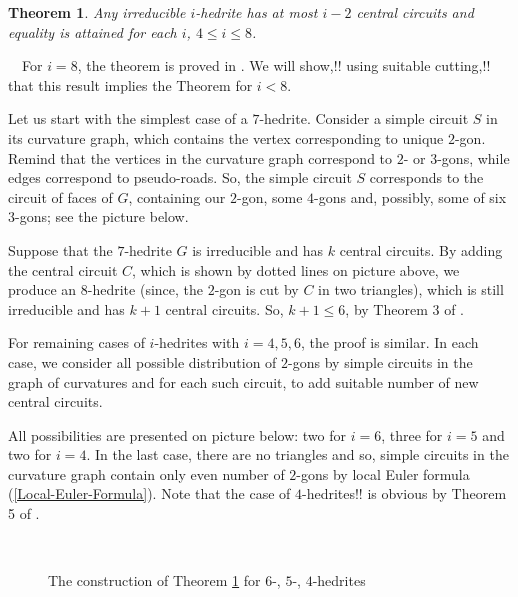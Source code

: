 \documentclass[12pt]{article}
\newtheorem{theor}{Theorem}
\newcommand{\proof}{\noindent{\bf Proof.}\ \ }
\begin{document}
\begin{theor}\label{irre}
Any irreducible $i$-hedrite has at most $i-2$ central circuits and equality is attained for each $i$, $4\leq i\leq 8$.
\end{theor}
\proof For $i=8$, the theorem is proved in \cite{DSt}. We will 
show,!! using suitable cutting,!! that this result implies the Theorem for $i<8$.

Let us start with the simplest case of a $7$-hedrite. Consider a simple circuit $S$ in its curvature graph, which contains the vertex corresponding to unique $2$-gon. Remind that the vertices in the curvature graph correspond to $2$- or $3$-gons, while edges correspond to pseudo-roads. So, the simple circuit $S$ corresponds to the circuit of faces of $G$, containing our $2$-gon, some $4$-gons and, possibly, some of six $3$-gons; see the picture below.


\begin{center}
\epsfxsize=40mm
\end{center}






Suppose that the $7$-hedrite $G$ is irreducible and has $k$ central circuits. By adding the central circuit $C$, which is shown by dotted lines on picture above, we produce an $8$-hedrite (since, the $2$-gon is cut by $C$ in two triangles), which is still irreducible and has $k+1$ central circuits. So, $k+1\leq 6$, by Theorem 3 of \cite{DSt}.


For remaining cases of $i$-hedrites with $i=4,5,6$, the proof is similar. In each case, we consider all possible distribution of $2$-gons by simple circuits in the graph of curvatures and for each such circuit, to add suitable number of new central circuits. 


All possibilities are presented on picture below: two for $i=6$, three for $i=5$ and two for $i=4$. In the last case, there are no triangles and so, simple circuits in the curvature graph contain only even number of $2$-gons by local Euler formula (\ref{Local-Euler-Formula}). Note that the case of 
$4$-hedrites!! is obvious by Theorem 5 of \cite{DSt}.



\begin{figure}
\centering
\mbox{\quad
{}\quad
{}}
\caption{The construction of Theorem \ref{irre} for $6$-, $5$-, $4$-hedrites}
\label{The456hedriteCases}
\end{figure}
\end{document}
